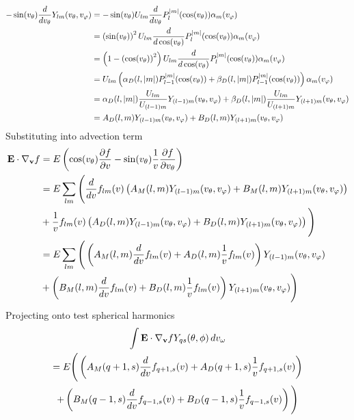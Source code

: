 \documentclass{article}[draft]
\begin{document}
\begin{align*}
-\sin\of{\vtheta} \frac{d}{d\vtheta} Y_{lm}\of{\vtheta,\vphi}
&=
-\sin\of{\vtheta} U_{lm} \frac{d}{d\vtheta} P^{|m|}_l\of{\cos\of{\vtheta}} \alpha_m\of{\vphi}
\\
&=
\left(\sin\of{\vtheta}\right)^2 U_{lm} \frac{d}{d\cos\of{\vtheta}} P^{|m|}_l\of{\cos\of{\vtheta}} \alpha_m\of{\vphi}
\\
&=
\left(1 - \left(\cos\of{\vtheta}\right)^2\right) U_{lm} \frac{d}{d\cos\of{\vtheta}} P^{|m|}_l\of{\cos\of{\vtheta}} \alpha_m\of{\vphi}
\\
&=
U_{lm} \left( \alpha_D\of{l,|m|} P^{|m|}_{l-1}\of{\cos\of{\vtheta}} 
+ \beta_D\of{l,|m|} P^{|m|}_{l-1}\of{\cos\of{\vtheta}} \right) \alpha_m\of{\vphi}
\\
&=
\alpha_D\of{l,|m|} \frac{U_{lm}}{U_{(l-1)m}} Y_{(l-1)m}\of{\vtheta,\vphi} 
+ \beta_D\of{l,|m|} \frac{U_{lm}}{U_{(l+1)m}} Y_{(l+1)m}\of{\vtheta,\vphi}
\\
&=
A_D\of{l,m} Y_{(l-1)m}\of{\vtheta,\vphi} 
+ 
B_D\of{l,m} Y_{(l+1)m}\of{\vtheta,\vphi}
\end{align*}
Substituting into advection term
\begin{align*}
\vect{E}\cdot \nabla_{\vect{v}} f
&= E 
\left( \cos\of{\vtheta} \frac{\partial f}{\partial \vr} 
- \sin\of{\vtheta} \frac{1}{\vr} \frac{\partial f}{\partial \vtheta} \right)
\\
&= E 
\sum_{lm}
\Bigg(
\frac{d}{d\vr}f_{lm}\of{\vr}
\left( A_M\of{l,m} Y_{(l-1)m}\of{\vtheta,\vphi} 
+ B_M\of{l,m} Y_{(l+1)m}\of{\vtheta,\vphi} \right)
\\
&+
\frac{1}{\vr}f_{lm}\of{\vr}
\left( A_D\of{l,m} Y_{(l-1)m}\of{\vtheta,\vphi} 
+ B_D\of{l,m} Y_{(l+1)m}\of{\vtheta,\vphi} \right) 
\Bigg)
\\
&= E 
\sum_{lm} 
\Bigg(
\left( A_M\of{l,m} \frac{d}{d\vr}f_{lm}\of{\vr} 
+ A_D\of{l,m} \frac{1}{\vr}f_{lm}\of{\vr} \right)
Y_{(l-1)m}\of{\vtheta,\vphi} 
\\
&+
\left( B_M\of{l,m} \frac{d}{d\vr}f_{lm}\of{\vr} 
+ B_D\of{l,m} \frac{1}{\vr}f_{lm}\of{\vr} \right)
Y_{(l+1)m}\of{\vtheta,\vphi} 
\Bigg)
\end{align*}
Projecting onto test spherical harmonics
\begin{multline*}
\myint \vect{E}\cdot \nabla_{\vect{v}} f Y_{qs}\of{\theta,\phi} \diff{\vomega}\\
= E 
\Bigg(
\left( A_M\of{q+1,s} \frac{d}{d\vr} f_{q+1,s} \of{\vr} 
+ A_D\of{q+1,s} \frac{1}{\vr} f_{q+1,s} \of{\vr} \right)
\\
+ \left( B_M\of{q-1,s} \frac{d}{d\vr} f_{q-1,s} \of{\vr} 
+ B_D\of{q-1,s} \frac{1}{\vr} f_{q-1,s} \of{\vr} \right)
\Bigg)
\end{multline*}
\end{document}
